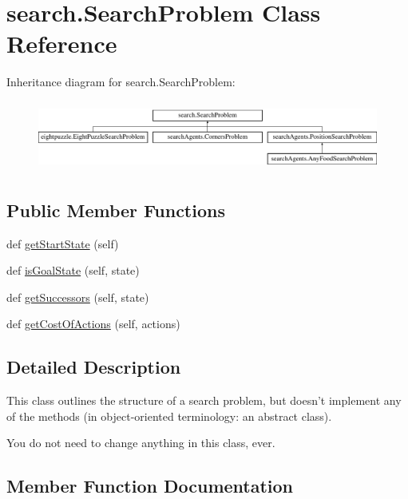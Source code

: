\hypertarget{classsearch_1_1_search_problem}{}\section{search.\+Search\+Problem Class Reference}
\label{classsearch_1_1_search_problem}
Inheritance diagram for search.\+Search\+Problem\+:\begin{figure}[H]
\begin{center}
\leavevmode
\includegraphics[height=2.323651cm]{classsearch_1_1_search_problem}
\end{center}
\end{figure}
\subsection*{Public Member Functions}
\begin{DoxyCompactItemize}
\item 
def \hyperlink{classsearch_1_1_search_problem_a4ffd125695767220d899c77f058e7577}{get\+Start\+State} (self)
\item 
def \hyperlink{classsearch_1_1_search_problem_ac856fffa6ab38abe071bde684b84b148}{is\+Goal\+State} (self, state)
\item 
def \hyperlink{classsearch_1_1_search_problem_a2e97eaf1f2b9fcb129711a862a4ebd63}{get\+Successors} (self, state)
\item 
def \hyperlink{classsearch_1_1_search_problem_a444a40c5ac6947d7ef35408f34690a1a}{get\+Cost\+Of\+Actions} (self, actions)
\end{DoxyCompactItemize}


\subsection{Detailed Description}
\begin{DoxyVerb}This class outlines the structure of a search problem, but doesn't implement
any of the methods (in object-oriented terminology: an abstract class).

You do not need to change anything in this class, ever.
\end{DoxyVerb}
 

\subsection{Member Function Documentation}
\mbox{\label{classsearch_1_1_search_problem_a444a40c5ac6947d7ef35408f34690a1a}} 
